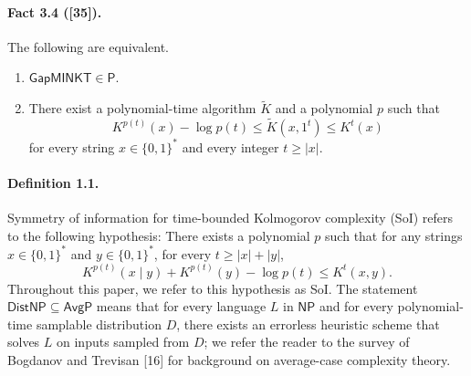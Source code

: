 \paragraph{Fact 3.4 ([35]).}
The following are equivalent.
\begin{enumerate}
\item $\mathsf{GapMINKT}\in\mathsf P$.
\item There exist a polynomial-time algorithm $\widetilde K$ and a polynomial $p$ such that
\[K^{p(t)}(x)-\log p(t)\leq\widetilde K(x,1^t)\leq K^t(x)\]
for every string $x\in\{0,1\}^*$ and every integer $t\geq|x|$.
\end{enumerate}
\paragraph{Definition 1.1.}
Symmetry of information for time-bounded Kolmogorov complexity (SoI) refers to the following hypothesis: There exists a polynomial $p$ such that for any strings $x\in\{0,1\}^*$ and $y\in\{0,1\}^*$, for every $t\geq|x|+|y|$,
\[K^{p(t)}(x\mid y)+K^{p(t)}(y)-\log p(t)\leq K^t(x,y).\tag{SoI}\]
Throughout this paper, we refer to this hypothesis as SoI.
The statement $\mathsf{DistNP}\subseteq\mathsf{AvgP}$ means that for every language $L$ in $\mathsf{NP}$ and for every polynomial-time samplable distribution $D$, there exists an errorless heuristic scheme that solves $L$ on inputs sampled from $D$; we refer the reader to the survey of Bogdanov and Trevisan [16] for background on average-case complexity theory.
